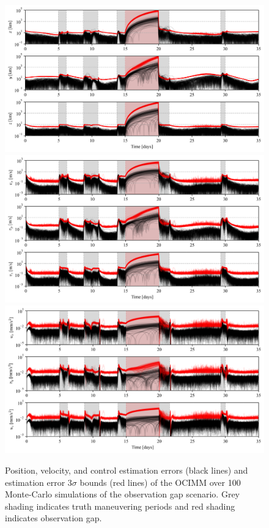 \documentclass[letterpaper, preprint, paper,11pt]{AAS}	%
\begin{document}
\begin{figure}
    \centering
    \includegraphics[width=0.85\linewidth]{Figures/position_3sigmas.png}
    \includegraphics[width=0.85\linewidth]{Figures/velocity_3sigmas.png}
    \includegraphics[width=0.85\linewidth]{Figures/control_3sigmas.png}
    \caption{Position, velocity, and control estimation errors (black lines) and estimation error $3\sigma$ bounds (red lines) of the OCIMM over 100 Monte-Carlo simulations of the observation gap scenario. Grey shading indicates truth maneuvering periods and red shading indicates observation gap.}
    \label{fig:three-sigmas}
\end{figure}
\end{document}
